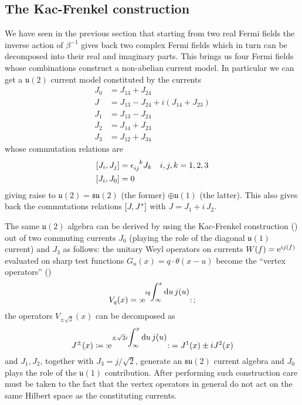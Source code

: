  \subsection{The Kac-Frenkel construction}
 \label{Kac-Frenkel}
 We have seen in the previous section that starting
 from two real Fermi fields the inverse action of
 $\beta^{-1}$ gives back two complex Fermi fields which
 in turn can be decomposed into their real and imaginary
 parts. This brings us four Fermi fields whose 
 combinations construct a non-abelian current model. 
 In particular we can get a $\mathfrak{u}(2)$ current
 model constituted by the currents
 \begin{align*}
 J_0&=J_{13} + J_{24}\\
 J&=J_{13}-J_{24}+i\left(J_{14}+J_{23}\right)\\
 J_1&=J_{13}-J_{24}\\
 J_2&=J_{14}+J_{23}\\
 J_3&=J_{12}+J_{34}
 \end{align*}
 whose commutation relations are
 \begin{align}
 \comm{J_i,J_j}&=\epsilon_{ij}^{\phantom{ij}k}J_k
 \quad i,j,k=1,2,3\\
 \comm{J_i,J_0}&=0
 \end{align}
 giving raise to $\mathfrak{u}(2)=\mathfrak{su}(2)$ (the former)
 $\oplus \mathfrak{u}(1)$ (the latter). This also gives back
 the commutations relations $[J,J^*]$ with $J=J_1
 +i\,J_2$.
 
 \bigskip
 The same $\mathfrak{u}(2)$ algebra can be derived
 by using the Kac-Frenkel construction (\cite{Kac:VA})
 out of two commuting currents $J_0$ (playing the role
 of the diagonal $\mathfrak{u}(1)$ current) and $J_3$ as 
 follows: the unitary Weyl operators on currents
 $W(f)=\operatorname{e}^{ij(f)}$ evaluated on sharp test functions
 $G_u(x)=q\cdot\theta(x-u)$ become the ``vertex operators''
 (\cite{LRboundary:2009})
 \[
 V_{q}(x)=
 \wick{\e^{iq \displaystyle{\int_{\infty}^x \dd u\,j(u)}}}\,;
 \]
 the operators $V_{\pm \sqrt{2}}(x)$ can be decomposed as  
 \[
 J^{\pm}(x)\coloneqq
 \wick{\e^{\pm\sqrt{2} i \displaystyle{\int_{\infty}^x \dd u\,j(u)}}}=
 J^1(x)\pm iJ^2(x)
 \]
 and $J_1,J_2$, together with $J_3= j/\sqrt{2}$, generate
 an $\mathfrak{su}(2)$ current algebra and $J_0$ plays
 the role of the $\mathfrak{u}(1)$ contribution. After
 performing such construction care must be taken to the
 fact that the vertex operators in general do not act
 on the same Hilbert space as the constituting currents.
 
